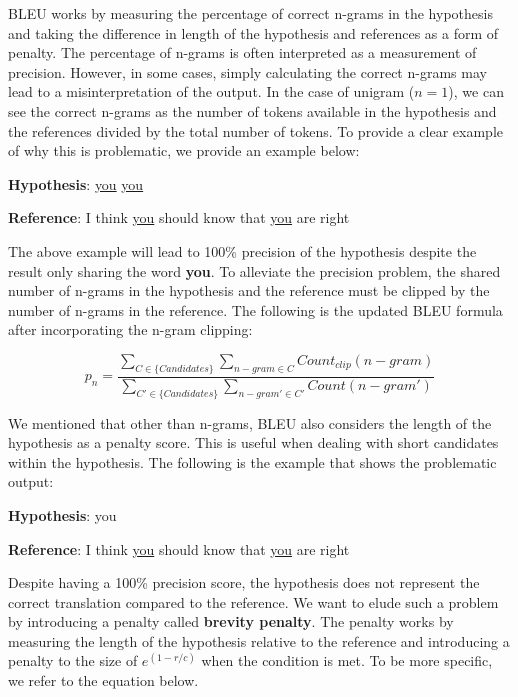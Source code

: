 BLEU works by measuring the percentage of correct n-grams in the hypothesis and taking the difference in length of the hypothesis and references as a form of penalty. The percentage of n-grams is often interpreted as a measurement of precision. However, in some cases, simply calculating the correct n-grams may lead to a misinterpretation of the output. In the case of unigram ($n=1$), we can see the correct n-grams as the number of tokens available in the hypothesis and the references divided by the total number of tokens. To provide a clear example of why this is problematic, we provide an example below:

\bigskip

\textbf{Hypothesis}: \underline{you} \underline{you}

\textbf{Reference}: I think \underline{you} should know that \underline{you} are right

\bigskip

The above example will lead to 100\% precision of the hypothesis despite the result only sharing the word \textbf{you}. To alleviate the precision problem, the shared number of n-grams in the hypothesis and the reference must be clipped by the number of n-grams in the reference. The following is the updated BLEU formula after incorporating the n-gram clipping:

\begin{equation}
    p_n=\frac{\sum_{C\in\{Candidates\}}\sum_{n-gram\in C}Count_{clip}(n-gram)}{\sum_{C'\in\{Candidates\}}\sum_{n-gram'\in C'}Count(n-gram')}
\end{equation}

We mentioned that other than n-grams, BLEU also considers the length of the hypothesis as a penalty score. This is useful when dealing with short candidates within the hypothesis. The following is the example that shows the problematic output:

\bigskip

\textbf{Hypothesis}: you

\textbf{Reference}: I think \underline{you} should know that \underline{you} are right

\bigskip

Despite having a 100\% precision score, the hypothesis does not represent the correct translation compared to the reference. We want to elude such a problem by introducing a penalty called \textbf{brevity penalty}. The penalty works by measuring the length of the hypothesis relative to the reference and introducing a penalty to the size of $e^{(1-r/c)}$ when the condition is met. To be more specific, we refer to the equation below.

